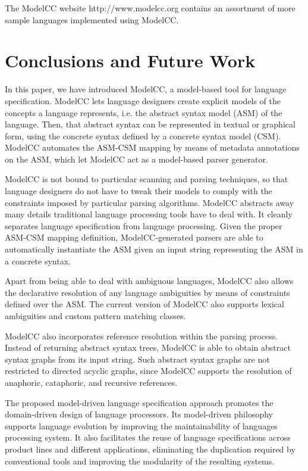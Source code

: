 \documentclass[preprint]{elsarticle}
\begin{document}
The ModelCC website http://www.modelcc.org contains an assortment of more sample languages implemented using ModelCC.

\section{Conclusions and Future Work} \label{sec:conclusionsfuturework}

In this paper, we have introduced ModelCC, a model-based tool for language specification.
ModelCC lets language designers create explicit models of the concepts a language represents, i.e. the abstract syntax model (ASM) of the language.
Then, that abstract syntax can be represented in textual or graphical form, using the concrete syntax defined by a concrete syntax model (CSM).
ModelCC automates the ASM-CSM mapping by means of metadata annotations on the ASM, which let ModelCC act as a model-based parser generator.

ModelCC is not bound to particular scanning and parsing techniques, so that language designers do not have to tweak their models to comply with the constraints imposed by particular parsing algorithms.
ModelCC abstracts away many details traditional language processing tools have to deal with.
It cleanly separates language specification from language processing.
Given the proper ASM-CSM mapping definition, ModelCC-generated parsers are able to automatically instantiate the ASM given an input string representing the ASM in a concrete syntax.

Apart from being able to deal with ambiguous languages, ModelCC also allows the declarative resolution of any language ambiguities by means of constraints defined over the ASM.
The current version of ModelCC also supports lexical ambiguities and custom pattern matching classes.

ModelCC also incorporates reference resolution within the parsing process.
Instead of returning abstract syntax trees, ModelCC is able to obtain abstract syntax graphs from its input string.
Such abstract syntax graphs are not restricted to directed acyclic graphs, since ModelCC supports the resolution of anaphoric, cataphoric, and recursive references.

The proposed model-driven language specification approach promotes the domain-driven design of language processors.
Its model-driven philosophy supports language evolution by improving the maintainability of languages processing system.
It also facilitates the reuse of language specifications across product lines and different applications, eliminating the duplication required by conventional tools and improving the modularity of the resulting systems.
\end{document}
